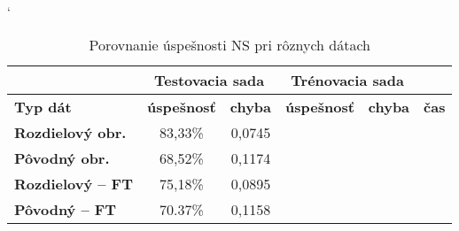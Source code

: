 





\begin{table}[h]
\catcode` %
\centering
\begin{tabular}{|l|c|c|c|c|c|}
\cline{2-5}
\multicolumn{1}{l}{} & \multicolumn{2}{|c|}{\textbf{Testovacia sada}} & \multicolumn{2}{c|}{\textbf{Trénovacia sada}} & \multicolumn{1}{l}{}\\ 
\hline
\textbf{Typ dát} & \textbf{úspešnosť} & \textbf{chyba} & \textbf{úspešnosť} & \textbf{chyba} & \textbf{čas} \\ \hline
\textbf{Rozdielový obr.} & 83,33\% & 0,0745 & & & \\ \hline
\textbf{Pôvodný obr.} & 68,52\% & 0,1174& & &\\ \hline
\textbf{Rozdielový -- FT} & 75,18\%& 0,0895& & &\\ \hline
\textbf{Pôvodný -- FT} & 70.37\%& 0,1158& & &\\
\hline
\end{tabular}
\caption{Porovnanie úspešnosti NS pri rôznych dátach}
\label{tab:neuraldatacmp}
\end{table}